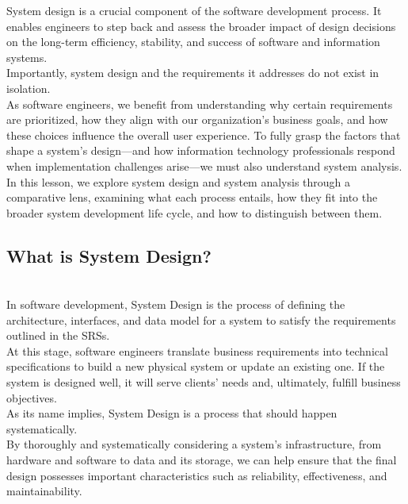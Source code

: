 

System design is a crucial component of the software development process. It enables engineers to step back and assess the broader impact of design decisions on the long-term efficiency, stability, and success of software and information systems.
\\
Importantly, system design and the requirements it addresses do not exist in isolation.
\\
As software engineers, we benefit from understanding why certain requirements are prioritized, how they align with our organization's business goals, and how these choices influence the overall user experience. To fully grasp the factors that shape a system's design---and how information technology professionals respond when implementation challenges arise---we must also understand system analysis.
\\
In this lesson, we explore system design and system analysis through a comparative lens, examining what each process entails, how they fit into the broader system development life cycle, and how to distinguish between them.

\subsection{What is System Design?}\label{3c90CR6O9XTSuOf5OUr3y}
\\
In software development, System Design is the process of defining the architecture, interfaces, and data model for a system to satisfy the requirements outlined in the SRSs.
\\
At this stage, software engineers translate business requirements into technical specifications to build a new physical system or update an existing one. If the system is designed well, it will serve clients' needs and, ultimately, fulfill business objectives.
\\
As its name implies, System Design is a process that should happen systematically.
\\
By thoroughly and systematically considering a system's infrastructure, from hardware and software to data and its storage, we can help ensure that the final design possesses important characteristics such as reliability, effectiveness, and maintainability.

